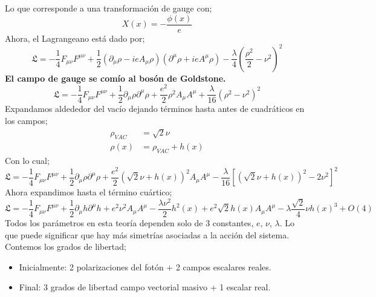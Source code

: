\documentclass[../main.tex]{subfiles}
\begin{document}
Lo que corresponde a una transformación de gauge con;
\begin{equation}
  X(x) = -\frac{\phi(x)}{e}
 \end{equation}
 Ahora, el Lagrangeano está dado por;
 \begin{equation}
   \mathfrak{L} = -\frac{1}{4}F_{\mu\nu}F^{\mu\nu} + \frac{1}{2}\left( \partial_\mu \rho - ieA_\mu\rho \right) \left( \partial^\mu \rho + ieA^\mu \rho \right) - \frac{\lambda}{4} \left( \frac{\rho^2}{2} - \nu^2 \right)^2
  \end{equation}
\textbf{El campo de gauge se comío al bosón de Goldstone.}
\begin{equation}
  \mathfrak{L} = -\frac{1}{4}F_{\mu\nu}F^{\mu\nu} + \frac{1}{2} \partial_\mu \rho \partial^\mu \rho + \frac{e^2}{2} \rho^2 A_\mu A^\mu + \frac{\lambda}{16} \left( \rho^2 - \nu^2 \right)^2
 \end{equation}
 Expandamos aldededor del vacío dejando términos hasta antes de cuadráticos en los campos;
 \begin{align*}
   \rho_{VAC} & = \sqrt{2}\nu \\
   \rho(x) & = \rho_{VAC} + h(x)
 \end{align*}
 Con lo cual;
\begin{equation}
  \mathfrak{L} = -\frac{1}{4}F_{\mu\nu}F^{\mu\nu} + \frac{1}{2} \partial_\mu \rho \partial^\mu \rho + \frac{e^2}{2} \left( \sqrt{2}\nu + h(x) \right)^2A_\mu A^\mu - \frac{\lambda}{16} \left[ \left( \sqrt{2}\nu + h(x) \right)^2 - 2\nu^2 \right]^2
 \end{equation} 
 Ahora expandimos hasta el término cuártico;
 \begin{equation}
   \mathfrak{L} = -\frac{1}{4}F_{\mu\nu} F^{\mu\nu} + \frac{1}{2}\partial_\mu h \partial^\mu h + e^2\nu^2 A_\mu A^\mu - \frac{\lambda\nu^2}{2} h^2(x) + e^2 \sqrt{2}h(x) A_\mu A^\mu - \lambda \frac{\sqrt{2}}{4}\nu h(x)^3 + O(4) 
  \end{equation}
  Todos los parámetros en esta teoría dependen solo de 3 constantes, $e$, $\nu$, $\lambda$. 
  Lo que puede significar que hay más simetrías asociadas a la acción del sistema.\\
  Contemos los grados de libertad;
  \begin{itemize}
    \item Inicialmente: 2 polarizaciones del fotón + 2 campos escalares reales.
     \item Final: 3 grados de libertad campo vectorial masivo + 1 escalar real.
  \end{itemize}
\end{document}
